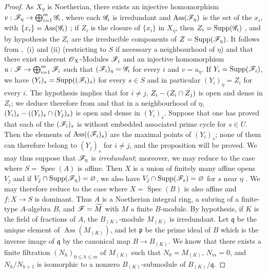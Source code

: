 \begin{proof}
As $X_\eta$ is Noetherian, there exists an injective homomorphism $v:\mathscr{F}_\eta\to\bigoplus_{i=1}^m\mathscr{G}_i$, where each $\mathscr{G}_i$ is irredundant and $\operatorname{Ass}(\mathscr{F}_\eta)$ is the set of the $x_i$, with $\{x_i\}=\operatorname{Ass}(\mathscr{G}_i)$ ; if $Z_i$ is the closure of $\{x_i\}$ in $X_\eta$, then $Z_i=\operatorname{Supp}(\mathscr{G}_i)$ , and by hypothesis the $Z_i$ are the irreducible components of $Z=\operatorname{Supp}(\mathscr{F}_\eta)$.
It follows from ,~(i) and (ii) (restricting to $S$ if necessary a neighbourhood of $\eta$) and  that there exist coherent $\mathscr{O}_X$-Modules $\mathscr{F}_i$ and an injective homomorphism $u:\mathscr{F}\to\bigoplus_{i=1}^m\mathscr{F}_i$ such that $(\mathscr{F}_i)_\eta=\mathscr{G}_i$ for every $i$ and $v=u_\eta$.
If $Y_i=\operatorname{Supp}(\mathscr{F}_i)$, we have $(Y_i)_s=\operatorname{Supp}((\mathscr{F}_i)_s)$ for every $s\in S$  and in particular $(Y_i)_\eta=Z_i$ for every $i$.
The hypothesis implies that for $i\neq j$, $Z_i-(Z_i\cap Z_j)$ is open and dense in $Z_i$; we deduce therefore from  and  that in a neighbourhood of $\eta$, $(Y_i)_s-((Y_i)_s\cap(Y_j)_s)$ is open and dense in $(Y_i)_s$.
Suppose that one has proved that each of the $(\mathscr{F}_i)_s$ is without embedded associated prime cycle for $s\in U$.
Then the elements of $\operatorname{Ass}((\mathscr{F}_i)_s)$ are the maximal points of $(Y_i)_s$; none of them can therefore belong to $(Y_j)_s$ for $i\neq j$, and the proposition will be proved. We may thus suppose that $\mathscr{F}_\eta$ is \emph{irredundant}; moreover, we may reduce to the case where $S=\operatorname{Spec}(A)$ is affine. Then $X$ is a union of finitely many affine opens $V_j$ and if $V_j\cap\operatorname{Supp}(\mathscr{F}_\eta)=\varnothing$, we also have $V_j\cap\operatorname{Supp}(\mathscr{F}_s)=\varnothing$ for $s$ near $\eta$ . We may therefore reduce to the case where $X=\operatorname{Spec}(B)$ is also affine and $f:X\to S$ is dominant. Thus $A$ is a Noetherian integral ring, a subring of a finite-type $A$-algebra $B$, and $\mathscr{F}=\widetilde{M}$ with $M$ a finite $B$-module. By hypothesis, if $K$ is the field of fractions of $A$, the $B_{(K)}$-module $M_{(K)}$ is irredundant.
Let $\mathfrak{q}$ be the unique
element of $\operatorname{Ass}(M_{(K)})$, and let $\mathfrak{p}$ be the prime ideal of $B$ which is the inverse image of $\mathfrak{q}$ by the canonical map $B\to B_{(K)}$.
We know  that there exists a finite filtration $(N_h)_{0\leqslant h\leqslant m}$ of $M_{(K)}$ such that $N_0=M_{(K)}$, $N_m=0$, and $N_h/N_{h+1}$ is isomorphic to a nonzero $B_{(K)}$-submodule of $B_{(K)}/\mathfrak{q}$.

\end{proof}

